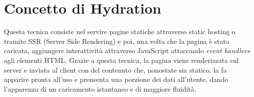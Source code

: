 \section{Concetto di Hydration}
Questa tecnica consiste nel servire pagine statiche attraverso static hosting o tramite SSR (Server Side Rendering) e
poi, una volta che la pagina è stata caricata, aggiungere interattività attraverso JavaScript attaccando \textit{event
handlers} agli elementi HTML.
Grazie a questa tecnica, la pagina viene renderizzata sul server e inviata al client con del contenuto che, nonostate
sia statico, la fa apparire pronta all'uso e prensenta una porzione dei dati all'utente, dando l'apparenza di un
caricamento istantaneo e di maggiore fluidità.